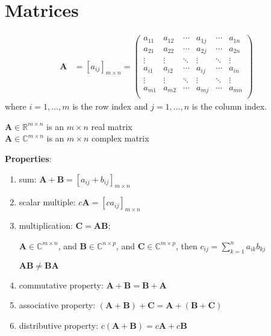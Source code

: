 \documentclass[12pt]{article}
\newcommand{\ve}[1]{\ensuremath{\mathbf{#1}}}
\begin{document}
\section{Matrices}

\begin{align}
    \ve{A} &= [a_{ij}]_{m\times n}   =    \begin{pmatrix}
      a_{11} & a_{12} & \cdots & a_{1j} & \cdots & a_{1n} \\
      a_{21} & a_{22} & \cdots & a_{2j} & \cdots & a_{2n} \\
       \vdots & \vdots & \ddots & \vdots & \ddots   & \vdots \\     
      a_{i1} & a_{i2} & \cdots & a_{ij} & \cdots & a_{in} \\
      \vdots & \vdots & \ddots & \vdots & \ddots   & \vdots \\
      a_{m1} & a_{m2} & \cdots & a_{mj} & \cdots & a_{mn} \\
    \end{pmatrix} \nonumber   
\end{align} 
%
where $i = 1, \dots, m$ is the row index and $j = 1, \dots, n$ is the column index.

$\ve{A} \in \mathbb{R}^{m \times n}$ is an $m \times n$ real matrix\\
$\ve{A} \in \mathbb{C}^{m \times n}$ is an $m \times n$ complex matrix

\textbf{Properties}:
%
\begin{enumerate}
\item sum: $\ve{A} + \ve{B} = [a_{ij} + b_{ij}]_{m \times n}$

\item scalar multiple: $c\ve{A} = [c a_{ij}]_{m \times n}$

\item multiplication: $\ve{C} = \ve{A}\ve{B}$;

$\ve{A} \in \mathbb{C}^{m \times n}$, and $\ve{B} \in \mathbb{C}^{n \times p}$, and $\ve{C} \in \mathbb{C}^{m \times p}$, then $c_{ij} = \sum_{k=1}^n a_{ik} b_{kj}$

$\ve{A}\ve{B} \neq \ve{B}\ve{A}$

\item commutative property: $\ve{A} + \ve{B} = \ve{B} + \ve{A}$

\item associative property: $(\ve{A} + \ve{B}) + \ve{C} = \ve{A} + (\ve{B} + \ve{C})$

\item distributive property: $c(\ve{A} + \ve{B}) = c\ve{A} + c\ve{B}$

\end{enumerate}
\end{document}
